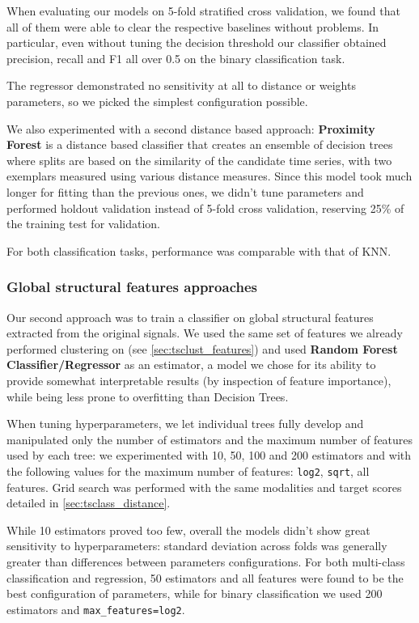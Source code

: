 When evaluating our models on 5-fold stratified cross validation, we found that all of them were able to clear the respective baselines without problems.
In particular, even without tuning the decision threshold our classifier obtained precision, recall and F1 all over 0.5 on the binary classification task.

The regressor demonstrated no sensitivity at all to distance or weights parameters, so we picked the simplest configuration possible.

We also experimented with a second distance based approach: \textbf{Proximity Forest} is a distance based classifier that creates an ensemble of decision trees where splits are based on the similarity of the candidate time series, with two exemplars measured using various distance measures.
Since this model took much longer for fitting than the previous ones, we didn't tune parameters and performed holdout validation instead of 5-fold cross validation, reserving 25\% of the training test for validation.

For both classification tasks, performance was comparable with that of KNN.

\subsubsection{Global structural features approaches}
Our second approach was to train a classifier on global structural features extracted from the original signals.
We used the same set of features we already performed clustering on (see \ref{sec:tsclust_features}) and used \textbf{Random Forest Classifier/Regressor} as an estimator, a model we chose for its ability to provide somewhat interpretable results (by inspection of feature importance), while being less prone to overfitting than Decision Trees.

When tuning hyperparameters, we let individual trees fully develop and manipulated only the number of estimators and the maximum number of features used by each tree: we experimented with 10, 50, 100 and 200 estimators and with the following values for the maximum number of features: \texttt{log2}, \texttt{sqrt}, all features.
Grid search was performed with the same modalities and target scores detailed in \ref{sec:tsclass_distance}.

While 10 estimators proved too few, overall the models didn't show great sensitivity to hyperparameters: standard deviation across folds was generally greater than differences between parameters configurations.
For both multi-class classification and regression, 50 estimators and all features were found to be the best configuration of parameters, while for binary classification we used 200 estimators and \texttt{max\_features=log2}.

